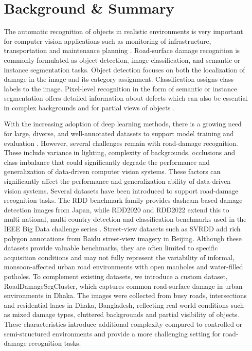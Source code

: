 \documentclass{article}
\begin{document}
\vspace{0.5em}
\noindent
\section*{Background \& Summary}
The automatic recognition of objects in realistic environments is very important for computer vision applications such as monitoring of infrastructure, transportation and maintenance planning \cite{Maeda2018Road,Zaidi2021Survey}. Road-surface damage recognition is commonly formulated as object detection, image classification, and semantic or instance segmentation tasks. Object detection focuses on both the localization of damage in the image and its category assignment. Classification assigns class labels to the image. Pixel-level recognition in the form of semantic or instance segmentation offers detailed information about defects which can also be essential in complex backgrounds and for partial views of objects \cite{Maeda2018Road,Maeda2021GAN}. 

With the increasing adoption of deep learning methods, there is a growing need for large, diverse, and well-annotated datasets to support model training and evaluation \cite{Arya2022RDD,Arya2024Global}. However, several challenges remain with road-damage recognition. These include variance in lighting, complexity of backgrounds, occlusions and class imbalance that could significantly degrade the performance and generalization of data-driven computer vision systems. These factors can significantly affect the performance and generalization ability of data-driven vision systems. Several datasets have been introduced to support road-damage recognition tasks. The RDD benchmark family \cite{Maeda2018Road,Maeda2021GAN} provides dashcam-based damage detection images from Japan, while RDD2020 and RDD2022 \cite{Arya2021Multi,Arya2022RDD} extend this to multi-national, multi-country detection and classification benchmarks used in the IEEE Big Data challenge series \cite{Arya2025Insights}. Street-view datasets such as SVRDD \cite{Ren2024SVRDD} add rich polygon annotations from Baidu street-view imagery in Beijing. Although these datasets provide valuable benchmarks, they are often limited to specific acquisition conditions and may not fully represent the variability of informal, monsoon-affected urban road environments with open manholes and water-filled potholes. To complement existing datasets, we introduce a custom dataset, RoadDamageSegCluster, which captures common road-surface damage in urban environments in Dhaka. The images were collected from busy roads, intersections and residential lanes in Dhaka, Bangladesh, reflecting real-world conditions such as mixed damage types, cluttered backgrounds and partial visibility of objects. These characteristics introduce additional complexity compared to controlled or semi-structured environments and provide a more challenging setting for road-damage recognition tasks.
\end{document}
